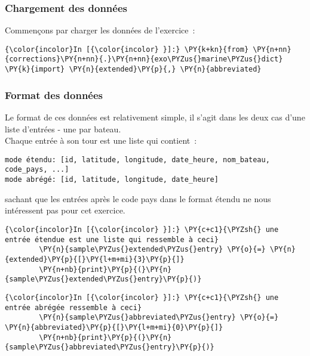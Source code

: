     \hypertarget{chargement-des-donnuxe9es}{%
\subsubsection{Chargement des données}\label{chargement-des-donnuxe9es}}

    Commençons par charger les données de l'exercice~:

    \begin{Verbatim}[commandchars=\\\{\}]
{\color{incolor}In [{\color{incolor} }]:} \PY{k+kn}{from} \PY{n+nn}{corrections}\PY{n+nn}{.}\PY{n+nn}{exo\PYZus{}marine\PYZus{}dict} \PY{k}{import} \PY{n}{extended}\PY{p}{,} \PY{n}{abbreviated}
\end{Verbatim}


    \hypertarget{format-des-donnuxe9es}{%
\subsubsection{Format des données}\label{format-des-donnuxe9es}}

    Le format de ces données est relativement simple, il s'agit dans les
deux cas d'une liste d'entrées - une par bateau.\\

Chaque entrée à son tour est une liste qui contient~:

\begin{verbatim}
mode étendu: [id, latitude, longitude, date_heure, nom_bateau, code_pays, ...]
mode abrégé: [id, latitude, longitude, date_heure]
\end{verbatim}

sachant que les entrées après le code pays dans le format étendu ne nous
intéressent pas pour cet exercice.

    \begin{Verbatim}[commandchars=\\\{\}]
{\color{incolor}In [{\color{incolor} }]:} \PY{c+c1}{\PYZsh{} une entrée étendue est une liste qui ressemble à ceci}
        \PY{n}{sample\PYZus{}extended\PYZus{}entry} \PY{o}{=} \PY{n}{extended}\PY{p}{[}\PY{l+m+mi}{3}\PY{p}{]}
        \PY{n+nb}{print}\PY{p}{(}\PY{n}{sample\PYZus{}extended\PYZus{}entry}\PY{p}{)}
\end{Verbatim}


    \begin{Verbatim}[commandchars=\\\{\}]
{\color{incolor}In [{\color{incolor} }]:} \PY{c+c1}{\PYZsh{} une entrée abrégée ressemble à ceci}
        \PY{n}{sample\PYZus{}abbreviated\PYZus{}entry} \PY{o}{=} \PY{n}{abbreviated}\PY{p}{[}\PY{l+m+mi}{0}\PY{p}{]}
        \PY{n+nb}{print}\PY{p}{(}\PY{n}{sample\PYZus{}abbreviated\PYZus{}entry}\PY{p}{)}
\end{Verbatim}


